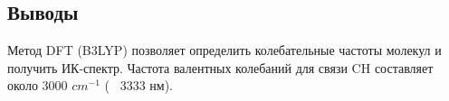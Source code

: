 \subsection{Выводы}
Метод DFT (B3LYP) позволяет определить колебательные частоты молекул и получить ИК-спектр. Частота валентных колебаний для связи CH составляет около 3000 $cm^{-1}$ (~ 3333 нм). 